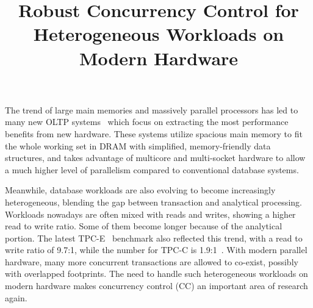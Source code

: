 \documentclass[preprint]{sig-alternate-nocprt}
\begin{document}

\title{Robust Concurrency Control for Heterogeneous Workloads on Modern Hardware}

\author{
\alignauthor
}

\maketitle

The trend of large main memories and massively parallel processors has led to many new OLTP systems~\cite{HStore,Hyper,Hekaton,Silo} which focus on extracting the most performance benefits from new hardware. These systems utilize spacious main memory to fit the whole working set in DRAM with simplified, memory-friendly data structures, and takes advantage of multicore and multi-socket hardware to allow a much higher level of parallelism compared to conventional database systems.

Meanwhile, database workloads are also evolving to become increasingly heterogeneous, blending the gap between transaction and analytical processing. Workloads nowadays are often mixed with reads and writes, showing a higher read to write ratio. Some of them become longer because of the analytical portion. The latest TPC-E~\cite{TPC-E} benchmark also reflected this trend, with a read to write ratio of 9.7:1, while the number for TPC-C is 1.9:1~\cite{TPC-Compare}. With modern parallel hardware, many more concurrent transactions are allowed to co-exist, possibly with overlapped footprints. The need to handle such heterogeneous workloads on modern hardware makes concurrency control (CC) an important area of research again.
\end{document}
